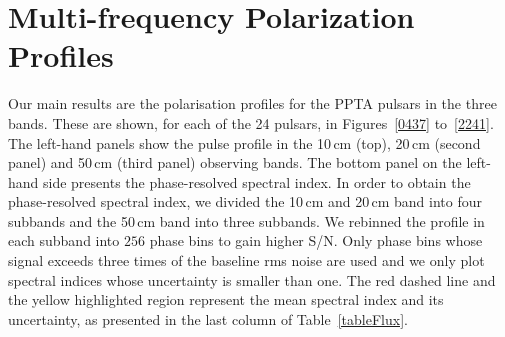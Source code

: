 \documentclass[useAMS,usenatbib]{mn2e}
\begin{document}
\section{Multi-frequency Polarization Profiles}


%
%

Our main results are the polarisation profiles for the PPTA pulsars in the three bands.  
These are shown, for each of the 24 pulsars, in Figures~\ref{0437} to~\ref{2241}. 
%
The left-hand panels show the pulse profile in the 10\,cm (top), 20\,cm (second panel) and 
50\,cm (third panel) observing bands. 
The bottom panel on the left-hand side presents the phase-resolved spectral index.   
%
In order to obtain the phase-resolved spectral index, we divided the 10\,cm and 20\,cm band 
into four subbands and the 50\,cm band into three subbands. We rebinned the profile in each 
subband into $256$ phase bins to gain higher S/N. Only phase bins whose signal 
exceeds three times of the baseline rms noise are used and we only plot spectral indices 
whose uncertainty is smaller than one. The red dashed line and the yellow highlighted region 
represent the mean spectral index and its uncertainty, as presented in the last column of 
Table~\ref{tableFlux}.
%
\end{document}
